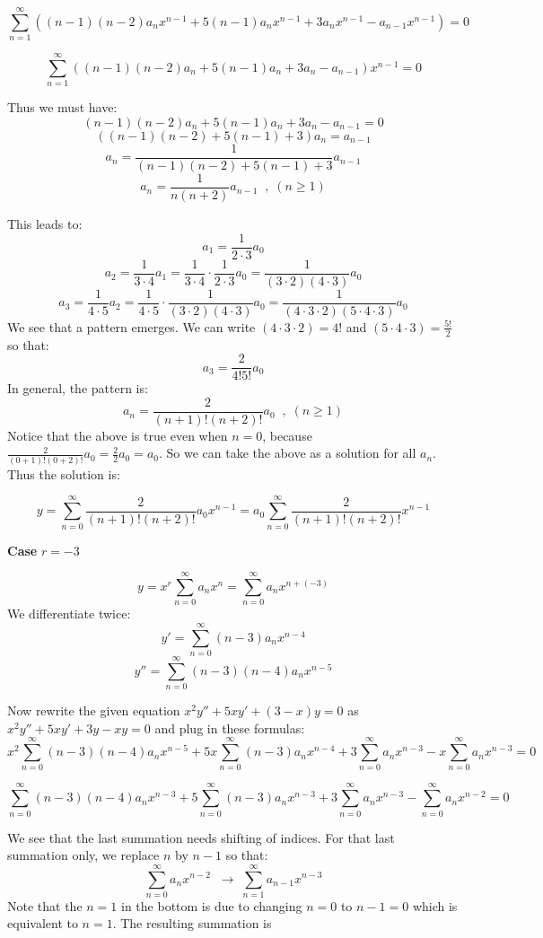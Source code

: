 \documentclass[12pt]{report}
\begin{document}
$$\sum_{n=1}^{\infty} \left( (n-1)(n-2) a_n x^{n-1} + 5 (n-1) a_n x^{n-1} + 3 a_n x^{n-1} - a_{n-1} x^{n-1} \right)= 0$$

$$\sum_{n=1}^{\infty} \left((n-1)(n-2) a_n + 5 (n-1) a_n + 3 a_n  -a_{n-1} \right) x^{n-1} = 0$$

Thus we must have:
$$ (n-1)(n-2) a_n + 5 (n-1) a_n + 3 a_n  -a_{n-1} = 0$$
$$ \left( (n-1)(n-2) + 5 (n-1) + 3 \right) a_n = a_{n-1}$$
$$ a_n = \frac{1}{(n-1)(n-2) + 5 (n-1) + 3} a_{n-1} $$
$$ a_n = \frac{1}{n(n+2)} a_{n-1} \; \; , \; (n\geq 1)$$

This leads to:
$$ a_1 = \frac{1}{2\cdot 3} a_0 $$
$$ a_2 = \frac{1}{3\cdot 4} a_1 = \frac{1}{3\cdot 4}\cdot \frac{1}{2\cdot 3} a_0 = \frac{1}{(3\cdot2) (4\cdot 3 )} a_0 $$
$$a_3 = \frac{1}{4\cdot 5} a_2 = \frac{1}{4\cdot 5}\cdot \frac{1}{(3\cdot2) (4\cdot 3 )} a_0 = \frac{1}{(4\cdot 3\cdot2) (5 \cdot 4\cdot 3 )} a_0 $$
We see that a pattern emerges. We can write $(4\cdot 3\cdot2)=4!$ and $(5 \cdot 4\cdot 3 )= \frac{5!}{2}$ so that:
$$a_3 = \frac{2}{4!5!} a_0 $$
In general, the pattern is:
$$a_n = \frac{2}{(n+1)!(n+2)!} a_0 \; \; , \; (n\geq 1)$$
Notice that the above is true even when $n=0$, because $\frac{2}{(0+1)!(0+2)!} a_0 = \frac{2}{2}a_0 = a_0$. So we can take the above as a solution for all $a_n$. Thus the solution is:

$$y = \sum_{n=0}^{\infty} \frac{2}{(n+1)!(n+2)!} a_0 x^{n-1} = a_0 \sum_{n=0}^{\infty} \frac{2}{(n+1)!(n+2)!} x^{n-1}$$

\textbf{Case } $r=-3$

$$y = x^r \sum_{n=0}^{\infty} a_n x^n  = \sum_{n=0}^{\infty} a_n x^{n+(-3)}$$
We differentiate twice:
$$y' = \sum_{n=0}^{\infty} (n-3) a_n x^{n-4} $$
$$y'' = \sum_{n=0}^{\infty} (n-3)(n-4) a_n x^{n-5} $$


Now rewrite the given equation $x^2 y'' + 5xy' + (3-x) y =0$ as $x^2 y'' + 5xy' + 3y -xy =0$ and plug in these formulas:
$$ x^2  \sum_{n=0}^{\infty} (n-3)(n-4) a_n x^{n-5} + 5x \sum_{n=0}^{\infty} (n-3) a_n x^{n-4} + 3 \sum_{n=0}^{\infty} a_n x^{n-3} - x  \sum_{n=0}^{\infty} a_n x^{n-3} = 0$$

$$  \sum_{n=0}^{\infty} (n-3)(n-4) a_n x^{n-3} + 5 \sum_{n=0}^{\infty} (n-3) a_n x^{n-3} + 3 \sum_{n=0}^{\infty} a_n x^{n-3} - \sum_{n=0}^{\infty} a_n x^{n-2} = 0$$

We see that the last summation needs shifting of indices. For that last summation only, we replace $n$ by $n-1$ so that:
$$\sum_{n=0}^{\infty} a_n x^{n-2} \; \; \rightarrow \; \sum_{n=1}^{\infty} a_{n-1} x^{n-3}  $$
Note that the $n=1$ in the bottom is due to changing $n=0$ to $n-1=0$ which is equivalent to $n=1$. The resulting summation is 
\end{document}
